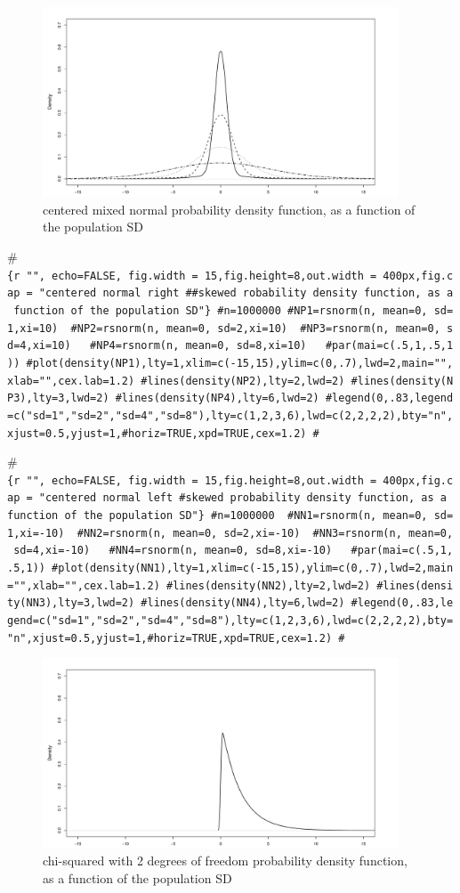 \documentclass[man,floatsintext]{apa6}
\begin{document}
\begin{appendix}
\begin{figure}
\includegraphics[width=400px]{W-test_files/figure-latex/unnamed-chunk-19-1} \caption{centered mixed normal probability density function, as a function of the population SD}\label{fig:unnamed-chunk-19}
\end{figure}

\#\texttt{\{r\ "",\ echo=FALSE,\ fig.width\ =\ 15,fig.height=8,out.width\ =\ \textquotesingle{}400px\textquotesingle{},fig.cap\ =\ "centered\ normal\ right\ \#\#skewed\ robability\ density\ function,\ as\ a\ function\ of\ the\ population\ SD"\}\ \#n=1000000\ \#NP1=rsnorm(n,\ mean=0,\ sd=1,xi=10)\ \ \#NP2=rsnorm(n,\ mean=0,\ sd=2,xi=10)\ \ \#NP3=rsnorm(n,\ mean=0,\ sd=4,xi=10)\ \ \ \#NP4=rsnorm(n,\ mean=0,\ sd=8,xi=10)\ \ \ \#par(mai=c(.5,1,.5,1))\ \#plot(density(NP1),lty=1,xlim=c(-15,15),ylim=c(0,.7),lwd=2,main="",xlab="",cex.lab=1.2)\ \#lines(density(NP2),lty=2,lwd=2)\ \#lines(density(NP3),lty=3,lwd=2)\ \#lines(density(NP4),lty=6,lwd=2)\ \#legend(0,.83,legend=c("sd=1","sd=2","sd=4","sd=8"),lty=c(1,2,3,6),lwd=c(2,2,2,2),bty="n",xjust=0.5,yjust=1,\#horiz=TRUE,xpd=TRUE,cex=1.2)\ \#}

\#\texttt{\{r\ "",\ echo=FALSE,\ fig.width\ =\ 15,fig.height=8,out.width\ =\ \textquotesingle{}400px\textquotesingle{},fig.cap\ =\ "centered\ normal\ left\ \#skewed\ probability\ density\ function,\ as\ a\ function\ of\ the\ population\ SD"\}\ \#n=1000000\ \ \#NN1=rsnorm(n,\ mean=0,\ sd=1,xi=-10)\ \ \#NN2=rsnorm(n,\ mean=0,\ sd=2,xi=-10)\ \ \#NN3=rsnorm(n,\ mean=0,\ sd=4,xi=-10)\ \ \ \#NN4=rsnorm(n,\ mean=0,\ sd=8,xi=-10)\ \ \ \#par(mai=c(.5,1,.5,1))\ \#plot(density(NN1),lty=1,xlim=c(-15,15),ylim=c(0,.7),lwd=2,main="",xlab="",cex.lab=1.2)\ \#lines(density(NN2),lty=2,lwd=2)\ \#lines(density(NN3),lty=3,lwd=2)\ \#lines(density(NN4),lty=6,lwd=2)\ \#legend(0,.83,legend=c("sd=1","sd=2","sd=4","sd=8"),lty=c(1,2,3,6),lwd=c(2,2,2,2),bty="n",xjust=0.5,yjust=1,\#horiz=TRUE,xpd=TRUE,cex=1.2)\ \#}

\begin{figure}
\includegraphics[width=400px]{W-test_files/figure-latex/unnamed-chunk-20-1} \caption{chi-squared with 2 degrees of freedom probability density function, as a function of the population SD}\label{fig:unnamed-chunk-20}
\end{figure}
\end{appendix}
\end{document}
